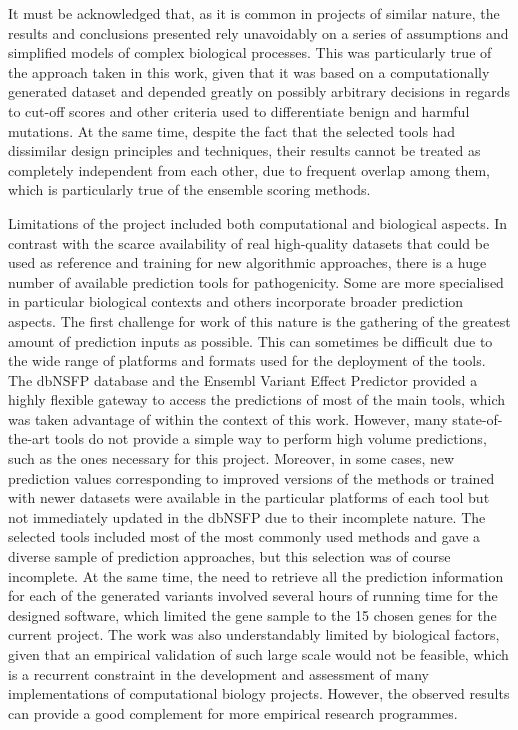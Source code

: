 \documentclass[12pt,MSc,wordcount,anon]{muthesis}
\begin{document}
\begin{flushleft}
It must be acknowledged that, as it is common in projects of similar nature, the results and conclusions presented rely unavoidably on a series of assumptions and simplified models of complex biological processes. This was particularly true of the approach taken in this work, given that it was based on a computationally generated dataset and depended greatly on possibly arbitrary decisions in regards to cut-off scores and other criteria used to differentiate benign and harmful mutations. At the same time, despite the fact that the selected tools had dissimilar design principles and techniques, their results cannot be treated as completely independent from each other, due to frequent overlap among them, which is particularly true of the ensemble scoring methods.

Limitations of the project included both computational and biological aspects. In contrast with the scarce availability of real high-quality datasets that could be used as reference and training for new algorithmic approaches, there is a huge number of available prediction tools for pathogenicity. Some are more specialised in particular biological contexts and others incorporate broader prediction aspects. The first challenge for work of this nature is the gathering of the greatest amount of prediction inputs as possible. This can sometimes be difficult due to the wide range of platforms and formats used for the deployment of the tools. The dbNSFP database and the Ensembl Variant Effect Predictor provided a highly flexible gateway to access the predictions of most of the main tools, which was taken advantage of within the context of this work. However, many state-of-the-art tools do not provide a simple way to perform high volume predictions, such as the ones necessary for this project. Moreover, in some cases, new prediction values corresponding to improved versions of the methods or trained with newer datasets were available in the particular platforms of each tool but not immediately updated in the dbNSFP due to their incomplete nature. The selected tools included most of the most commonly used methods and gave a diverse sample of prediction approaches, but this selection was of course incomplete. At the same time, the need to retrieve all the prediction information for each of the generated variants involved several hours of running time for the designed software, which limited the gene sample to the 15 chosen genes for the current project.  The work was also understandably limited by biological factors, given that an empirical validation of such large scale would not be feasible, which is a recurrent constraint in the development and assessment of many implementations of computational biology projects. However, the observed results can provide a good complement for more empirical research programmes.


\end{flushleft}
\end{document}
